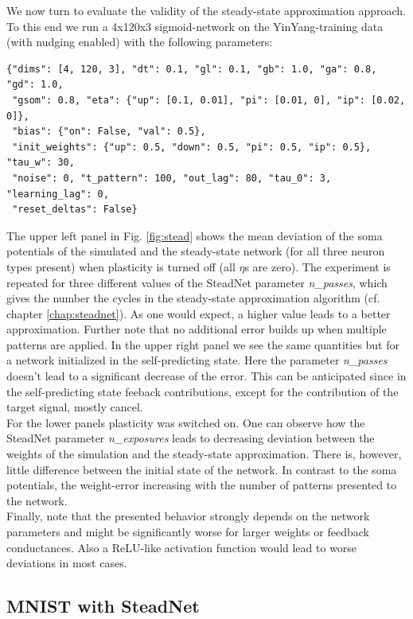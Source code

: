 \documentclass[12pt,a4paper]{article}
\begin{document}
We now turn to evaluate the validity of the steady-state approximation approach. To this end we run a 4x120x3 sigmoid-network on the YinYang-training data (with nudging enabled) with the following parameters:
\begin{verbatim}
{"dims": [4, 120, 3], "dt": 0.1, "gl": 0.1, "gb": 1.0, "ga": 0.8, "gd": 1.0,
 "gsom": 0.8, "eta": {"up": [0.1, 0.01], "pi": [0.01, 0], "ip": [0.02, 0]},
 "bias": {"on": False, "val": 0.5},
 "init_weights": {"up": 0.5, "down": 0.5, "pi": 0.5, "ip": 0.5}, "tau_w": 30,
 "noise": 0, "t_pattern": 100, "out_lag": 80, "tau_0": 3, "learning_lag": 0,
 "reset_deltas": False}
\end{verbatim}
The upper left panel in Fig. \ref{fig:stead} shows the mean deviation of the soma potentials of the simulated and the steady-state network (for all three neuron types present) when plasticity is turned off (all $\eta$s are zero). The experiment is repeated for three different values of the SteadNet parameter \textit{n\_passes}, which gives the number the cycles in the steady-state approximation algorithm (cf. chapter \ref{chap:steadnet}). As one would expect, a higher value leads to a better approximation. Further note that no additional error builds up when multiple patterns are applied. In the upper right panel we see the same quantities but for a network initialized in the self-predicting state. Here the parameter \textit{n\_passes} doesn't lead to a significant decrease of the error. This can be anticipated since in the self-predicting state feeback contributions, except for the contribution of the target signal, mostly cancel.\\
For the lower panels plasticity was switched on. One can observe how the SteadNet parameter \textit{n\_exposures} leads to decreasing deviation between the weights of the simulation and the steady-state approximation. There is, however, little difference between the initial state of the network. In contrast to the soma potentials, the weight-error increasing with the number of patterns presented to the network.\\
Finally, note that the presented behavior strongly depends on the network parameters and might be significantly worse for larger weights or feedback conductances. Also a ReLU-like activation function would lead to worse deviations in most cases.


\subsection{MNIST with SteadNet}
\end{document}
